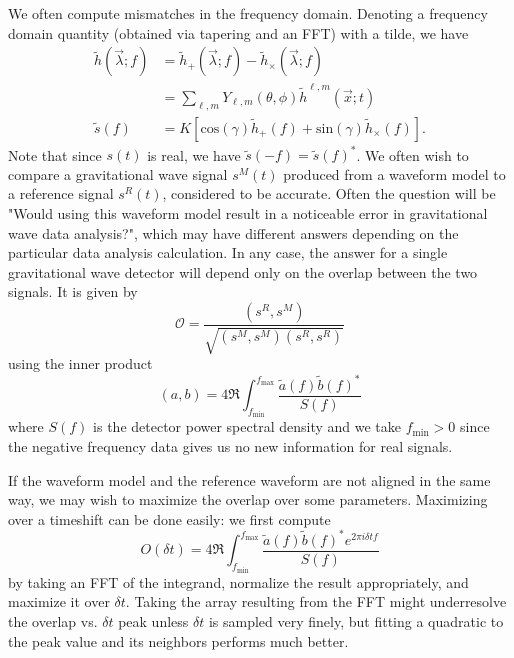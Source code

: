 \documentclass{article}
\begin{document}
We often compute mismatches in the frequency domain.
Denoting a frequency domain quantity (obtained via tapering and an FFT) with
a tilde, we have
\begin{align}
\tilde{h}(\vec{\lambda}; f) &= \tilde{h}_+(\vec{\lambda}; f) -
                              \tilde{h}_\times(\vec{\lambda}; f) \\
        &= \sum_{\ell, m} Y_{\ell, m}(\theta, \phi)
            \tilde{h}^{\ell, m}(\vec{x}; t) \\
\tilde{s}(f) &= K \left[
        \mathrm{cos}(\gamma) \tilde{h}_+(f) +
        \mathrm{sin}(\gamma) \tilde{h}_\times(f) \right].
\end{align}
Note that since $s(t)$ is real, we have $\tilde{s}(-f) = \tilde{s}(f)^*$.
We often wish to compare a gravitational wave signal $s^M(t)$
produced from a waveform model to a reference signal $s^R(t)$, considered
to be accurate.
Often the question will be "Would using this waveform model result in a
noticeable error in gravitational wave data analysis?", which may have
different answers depending on the particular data analysis calculation.
In any case, the answer for a single gravitational wave detector will
depend only on the overlap between the two signals.
It is given by
\begin{equation}
\mathcal{O} = \frac{(s^R, s^M)}{\sqrt{(s^M, s^M)(s^R, s^R)}}
\end{equation}
using the inner product
\begin{equation}
(a, b) = 4 \Re \int_{f_\mathrm{min}}^{f_\mathrm{max}}
        \frac{\tilde{a}(f) \tilde{b}(f)^*}{S(f)}
\end{equation}
where $S(f)$ is the detector power spectral density
and we take $f_\mathrm{min} > 0$ since the negative frequency data gives us
no new information for real signals.

If the waveform model and the reference waveform are not aligned in the same
way, we may wish to maximize the overlap over some parameters.
Maximizing over a timeshift can be done easily: we first compute
\begin{equation}
O(\delta t) = 4 \Re \int_{f_\mathrm{min}}^{f_\mathrm{max}}
        \frac{\tilde{a}(f) \tilde{b}(f)^* e^{2\pi i \delta t f}}{S(f)}
\end{equation}
by taking an FFT of the integrand, normalize the result appropriately,
and maximize it over $\delta t$.
Taking the array resulting from the FFT might underresolve the overlap
vs. $\delta t$ peak unless $\delta t$ is sampled very finely, but fitting
a quadratic to the peak value and its neighbors performs much better.
\end{document}
